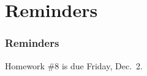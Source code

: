 \documentclass[11pt]{beamer}
\begin{document}
\section{Reminders}

\begin{frame}
  \frametitle{Reminders}
  \Enlarge

  \begin{itemize}
  \myitem  Homework \#8 is due Friday, Dec.\ 2.
 
  \end{itemize}
\end{frame}
\end{document}
